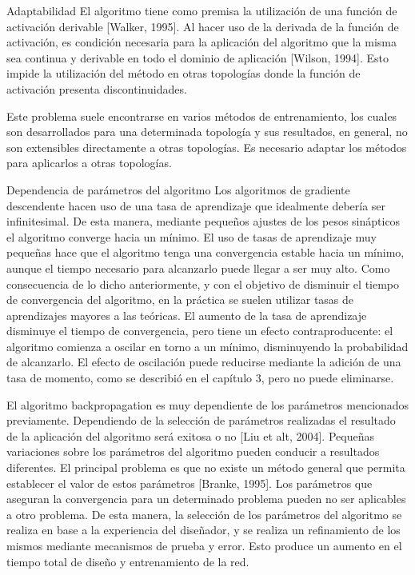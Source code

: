 \documentclass[11pt]{article}
\begin{document}
\begin{titlepage}
\begin{listaDefiniciones}
 \item[Adaptabilidad] El algoritmo tiene como premisa la utilizaci\'on de una funci\'on de activaci\'on derivable [Walker, 1995]. Al hacer uso de la derivada de la funci\'on de activaci\'on, es condici\'on necesaria para la aplicaci\'on del algoritmo que la misma sea continua y derivable en todo el dominio de aplicaci\'on [Wilson, 1994]. Esto impide la utilizaci\'on del m\'etodo en otras topolog\'ias donde la funci\'on de activaci\'on presenta discontinuidades.

 Este problema suele encontrarse en varios m\'etodos de entrenamiento, los cuales son desarrollados para una determinada topolog\'ia y sus resultados, en general, no son extensibles directamente a otras topolog\'ias. Es necesario adaptar los m\'etodos para aplicarlos a otras topolog\'ias.

\item[Dependencia de par\'ametros del algoritmo] Los algoritmos de gradiente descendente hacen uso de una tasa de aprendizaje que idealmente deber\'ia ser infinitesimal. De esta manera, mediante peque\~nos ajustes de los pesos sin\'apticos el algoritmo converge hacia un m\'inimo. El uso de tasas de aprendizaje muy peque\~nas hace que el algoritmo tenga una convergencia estable hacia un m\'inimo, aunque el tiempo necesario para alcanzarlo puede llegar a ser muy alto. Como consecuencia de lo dicho anteriormente, y con el objetivo de disminuir el tiempo de convergencia del algoritmo, en la pr\'actica se suelen utilizar tasas de aprendizajes mayores a las te\'oricas. El aumento de la tasa de aprendizaje disminuye el tiempo de convergencia, pero tiene un efecto contraproducente: el algoritmo comienza a oscilar en torno a un m\'inimo, disminuyendo la probabilidad de alcanzarlo. El efecto de oscilaci\'on puede reducirse mediante la adici\'on de una tasa de momento, como se describi\'o en el cap\'itulo 3, pero no puede eliminarse.

 El algoritmo backpropagation es muy dependiente de los par\'ametros mencionados previamente. Dependiendo de la selecci\'on de par\'ametros realizadas el resultado de la aplicaci\'on del algoritmo ser\'a exitosa o no [Liu et alt, 2004]. Peque\~nas variaciones sobre los par\'ametros del algoritmo pueden conducir a resultados diferentes. El principal problema es que no existe un m\'etodo general que permita establecer el valor de estos par\'ametros [Branke, 1995]. Los par\'ametros que aseguran la convergencia para un determinado problema pueden no ser aplicables a otro problema. De esta manera, la selecci\'on de los par\'ametros del algoritmo se realiza en base a la experiencia del dise\~nador, y se realiza un refinamiento de los mismos mediante mecanismos de prueba y error. Esto produce un aumento en el tiempo total de dise\~no y entrenamiento de la red.


\end{listaDefiniciones}
\end{titlepage}
\end{document}

